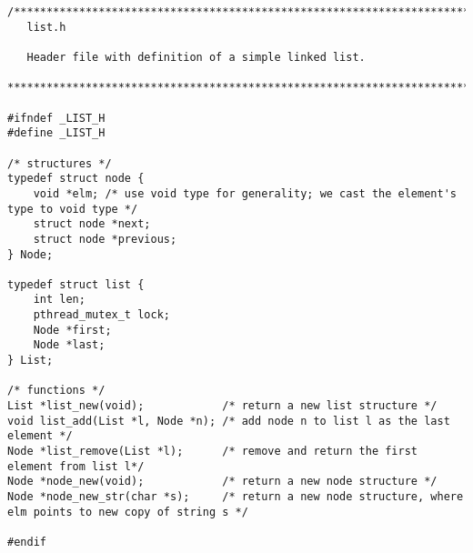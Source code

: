 \begin{lstlisting}
/******************************************************************************
   list.h 

   Header file with definition of a simple linked list.

******************************************************************************/

#ifndef _LIST_H
#define _LIST_H

/* structures */
typedef struct node {
	void *elm; /* use void type for generality; we cast the element's type to void type */
	struct node *next;
	struct node *previous;
} Node;

typedef struct list {
	int len;
	pthread_mutex_t lock;
	Node *first;
	Node *last;
} List;

/* functions */
List *list_new(void);            /* return a new list structure */
void list_add(List *l, Node *n); /* add node n to list l as the last element */
Node *list_remove(List *l);      /* remove and return the first element from list l*/
Node *node_new(void);            /* return a new node structure */
Node *node_new_str(char *s);     /* return a new node structure, where elm points to new copy of string s */

#endif
\end{lstlisting}